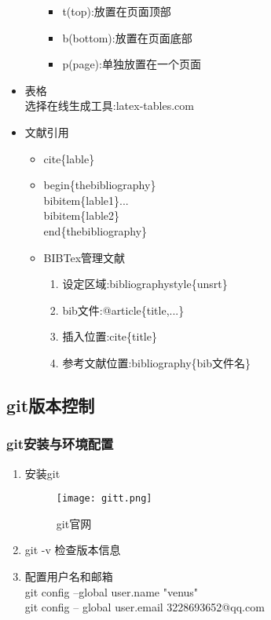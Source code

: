 \documentclass[a4paper,12pt]{article}
\begin{document}
\begin{itemize}
\begin{itemize}
\begin{itemize}
                        \item t(top):放置在页面顶部
                        \item b(bottom):放置在页面底部
                        \item p(page):单独放置在一个页面
                    \end{itemize}
          \end{itemize}
    \item 表格\\选择在线生成工具:latex-tables.com
    \item 文献引用
          \begin{itemize}
              \item cite\{lable\}
              \item begin\{thebibliography\}\\bibitem\{lable1\}...\\bibitem\{lable2\}\\end\{thebibliography\}
              \item BIBTex管理文献
                    \begin{enumerate}
                        \item 设定区域:bibliographystyle\{unsrt\}
                        \item bib文件:@article\{title,...\}
                        \item 插入位置:cite\{title\}
                        \item 参考文献位置:bibliography\{bib文件名\}
                    \end{enumerate}
          \end{itemize}
\end{itemize}

\subsection{\color{red}git版本控制}
\subsubsection{\color{green}git安装与环境配置}
\begin{enumerate}
    \item 安装git
          \begin{figure}[htbp]
              \centering
              \texttt{[image: gitt.png]}
              \label{git}
              \caption{git官网}
          \end{figure}
    \item git -v 检查版本信息
    \item 配置用户名和邮箱\\git config --global user.name "venus"\\git config -- global user.email 3228693652@qq.com

\end{enumerate}
\end{document}
